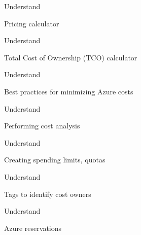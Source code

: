 \documentclass{scrartcl}
\newenvironment{flashcard}[2][]{%
    #1
    \vfill
    \centerline{\Large{#2}}
    \vfill
    \newpage
}
{\newpage}
\begin{document}
    \begin{flashcard}[Understand]{Pricing calculator}

    \end{flashcard}

    \begin{flashcard}[Understand]{Total Cost of Ownership (TCO) calculator}

    \end{flashcard}

    \begin{flashcard}[Understand]{Best practices for minimizing Azure costs}

    \end{flashcard}

    \begin{flashcard}[Understand]{Performing cost analysis}

    \end{flashcard}

    \begin{flashcard}[Understand]{Creating spending limits, quotas}

    \end{flashcard}

    \begin{flashcard}[Understand]{Tags to identify cost owners}

    \end{flashcard}

    \begin{flashcard}[Understand]{Azure reservations}

    \end{flashcard}
\end{document}
